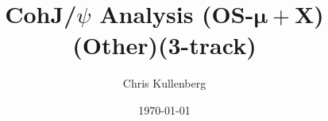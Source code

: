 \title{CohJ/$\psi$ Analysis (\textbf{OS}-$\boldsymbol{\mu+}$\textbf{X})(\textbf{Other})(\textbf{3-track})}
\author{Chris Kullenberg}
\date{\today}
